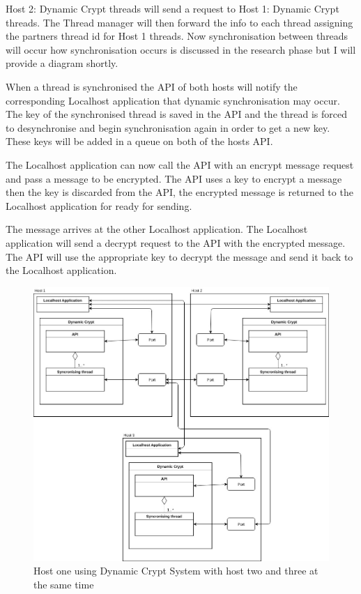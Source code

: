 Host 2: Dynamic Crypt threads will send a request to Host 1: Dynamic Crypt threads. The Thread manager will then forward the info to each thread assigning the partners thread id for Host 1 threads. Now synchronisation between threads will occur how synchronisation occurs is discussed in the research phase but I will provide a diagram shortly.

When a thread is synchronised the API of both hosts will notify the corresponding Localhost application that dynamic synchronisation may occur. The key of the synchronised thread is saved in the API and the thread is forced to desynchronise and begin synchronisation again in order to get a new key. These keys will be added in a queue on both of the hosts API.

The Localhost application can now call the API with an encrypt message request and pass a message to be encrypted. The API uses a key to encrypt a message then the key is discarded from the API, the encrypted message is returned to the Localhost application for ready for sending. 

The message arrives at the other Localhost application. The Localhost application will send a decrypt request to the API with the encrypted message. The API will use the appropriate key to decrypt the message and send it back to the Localhost application. 









\begin{figure}[!h]
  \centering
      \includegraphics[width=1\textwidth]{Figures/basic-3hosts.jpg}
  \caption[Host one using Dynamic Crypt System with host two and three at the same time]{Host one using Dynamic Crypt System with host two and three at the same time}
  \label{fig:3hostsbasic}
\end{figure}

